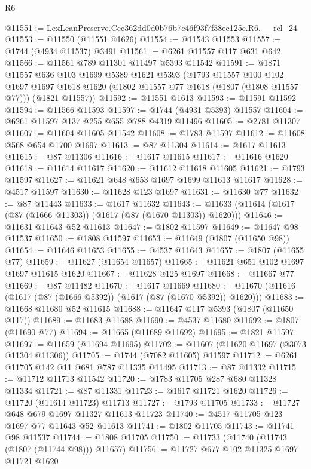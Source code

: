 \begin{lexlean}{R6}
\begin{coremodule}
@11551 := LexLeanPreserve.Ccc362dd0d0b76b7c46f93f7f38ec125e.R6.__rel_24
@11553 := @11550 (@11551 @1626)
@11554 := @11543 @11553
@11557 := @1744 (@4934 @11537) @3491
@11561 := @6261 @11557 @117 @631 @642
@11566 := @11561 @789 @11301 @11497 @5393 @11542
@11591 := @1871
    @11557
    @636
    @103
    @1699
    @5389
    @1621
    @5393
    (@1793
      @11557
      @100
      @102
      @1697
      @1697
      @1618
      @1620
      (@1802 @11557 @77 @1618 (@1807 (@1808 @11557 @77)))
      (@1821 @11557))
@11592 := @11551 @1613
@11593 := @11591 @11592
@11594 := @11566 @11593
@11597 := @1744 (@4931 @5393) @11557
@11604 := @6261 @11597 @137 @255 @655 @788 @4319 @11496
@11605 := @2781 @11307
@11607 := @11604 @11605 @11542
@11608 := @1783 @11597
@11612 := @11608 @568 @654 @1700 @1697
@11613 := @87 @11304
@11614 := @1617 @11613
@11615 := @87 @11306
@11616 := @1617 @11615
@11617 := @11616 @1620
@11618 := @11614 @11617
@11620 := @11612 @11618 @11605
@11621 := @1793 @11597
@11627 := @11621 @648 @653 @1697 @1699 @11613 @11617
@11628 := @4517 @11597
@11630 := @11628 @123 @1697
@11631 := @11630 @77
@11632 := @87 @11443
@11633 := @1617 @11632
@11643 := @11633 (@11614 (@1617 (@87 (@1666 @11303)) (@1617 (@87 (@1670 @11303)) @1620)))
@11646 := @11631 @11643 @52 @11613
@11647 := @1802 @11597
@11649 := @11647 @98 @11537
@11650 := @1808 @11597
@11653 := @11649 (@1807 (@11650 @98))
@11654 := @11646 @11653
@11655 := @4537 @11643
@11657 := @1807 (@11655 @77)
@11659 := @11627 (@11654 @11657)
@11665 := @11621 @651 @102 @1697 @1697 @11615 @1620
@11667 := @11628 @125 @1697
@11668 := @11667 @77
@11669 := @87 @11482
@11670 := @1617 @11669
@11680 := @11670 (@11616 (@1617 (@87 (@1666 @5392)) (@1617 (@87 (@1670 @5392)) @1620)))
@11683 := @11668 @11680 @52 @11615
@11688 := @11647 @117 @5393 (@1807 (@11650 @117))
@11689 := @11683 @11688
@11690 := @4537 @11680
@11692 := @1807 (@11690 @77)
@11694 := @11665 (@11689 @11692)
@11695 := @1821 @11597
@11697 := @11659 (@11694 @11695)
@11702 := @11607 (@11620 @11697 (@3073 @11304 @11306))
@11705 := @1744 (@7082 @11605) @11597
@11712 := @6261 @11705 @142 @11 @681 @787 @11335 @11495
@11713 := @87 @11332
@11715 := @11712 @11713 @11542
@11720 := @1783 @11705 @287 @680 @11328 @11334
@11721 := @87 @11331
@11723 := @1617 @11721 @1620
@11726 := @11720 (@11614 @11723) @11713
@11727 := @1793 @11705
@11733 := @11727 @648 @679 @1697 @11327 @11613 @11723
@11740 := @4517 @11705 @123 @1697 @77 @11643 @52 @11613
@11741 := @1802 @11705
@11743 := @11741 @98 @11537
@11744 := @1808 @11705
@11750 := @11733 (@11740 (@11743 (@1807 (@11744 @98))) @11657)
@11756 := @11727 @677 @102 @11325 @1697 @11721 @1620

\end{coremodule}
\end{lexlean}
